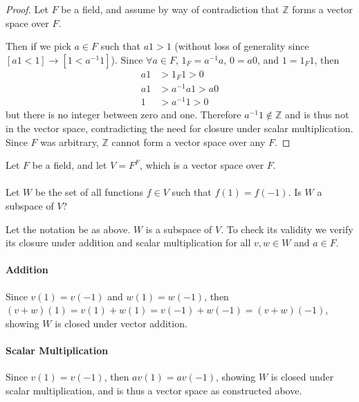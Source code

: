 \documentclass{article}
\begin{document}
\begin{solution}
\begin{proof}
Let $F$ be a field, and assume by way of contradiction that $\mathbb{Z}$ forms a vector space over $F$.

Then if we pick $a \in F$ such that $a1>1$ (without loss of generality since $[a1<1]\to [1<a^{-1}1]$).
Since $\forall a\in F$, $1_{F}=a^{-1}a$, $0=a0$, and $1 = 1_{F}1$, then
\begin{align*}
a1 &> 1_{F}1 > 0	\\
a1 &> a^{-1}a1 > a0	\\
1 &> a^{-1}1 > 0
\end{align*}
but there is no integer between zero and one. Therefore $a^{-1}1 \notin \mathbb{Z}$ and is thus not in the vector space, contradicting the need for closure under scalar multiplication. Since $F$ was arbitrary, $\mathbb{Z}$ cannot form a vector space over any $F$.
\end{proof}
\end{solution}

\setcounter{problem}{86}
\begin{problem}
Let $F$ be a field, and let $V=F^{F}$, which is a vector space over $F$.

\paragraph{}
Let $W$ be the set of all functions $f\in V$ such that $f(1)=f(-1)$. Is $W$ a subspace of $V$?
\end{problem}

\begin{solution}
Let the notation be as above. $W$ is a subspace of $V$. To check its validity we verify its closure under addition and scalar multiplication for all $v,w \in W$ and $a \in F$.

\paragraph{Addition}
Since $v(1)=v(-1)$ and $w(1)=w(-1)$, then $(v+w)(1)=v(1)+w(1)=v(-1)+w(-1)=(v+w)(-1)$, showing $W$ is closed under vector addition.

\paragraph{Scalar Multiplication}
Since $v(1)=v(-1)$, then $av(1)=av(-1)$, showing $W$ is closed under scalar multiplication, and is thus a vector space as constructed above.
\end{solution}
\end{document}
